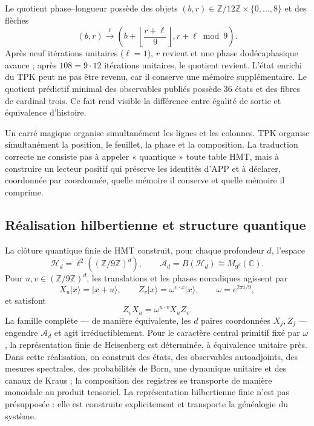 Le quotient phase--longueur possède des objets $(b,r)\in\mathbb Z/12\mathbb Z
\times\{0,\ldots,8\}$ et des flèches
\[
 (b,r)\xrightarrow{\ell}
 \left(b+\left\lfloor\frac{r+\ell}{9}\right\rfloor,
       r+\ell\bmod9\right).
 \tag{GMC-2.11}
\]
Après neuf itérations unitaires ($\ell=1$), $r$ revient et une phase
dodécaphasique avance ; après $108=9\cdot12$ itérations unitaires, le quotient revient.
L'état enrichi du TPK peut ne pas
être revenu, car il conserve une mémoire supplémentaire. Le quotient prédictif
minimal des observables publiés possède 36 états et des fibres de cardinal
trois. Ce fait rend visible la différence entre égalité de sortie et
équivalence d'histoire.

\begin{intuitionbox}
Un carré magique organise simultanément les lignes et les colonnes. TPK organise
simultanément la position, le feuillet, la phase et la composition. La traduction correcte ne
consiste pas à appeler « quantique » toute table HMT, mais à construire un lecteur
positif qui préserve les identités d'APP et à déclarer, coordonnée par
coordonnée, quelle mémoire il conserve et quelle mémoire il comprime.
\end{intuitionbox}

\subsection{Réalisation hilbertienne et structure quantique}

La clôture quantique finie de HMT construit, pour chaque profondeur
$d$, l'espace
\[
 \mathcal H_d=\ell^2((\mathbb Z/9\mathbb Z)^d),
 \qquad
 \mathcal A_d=B(\mathcal H_d)\cong M_{9^d}(\mathbb C).
 \tag{GMC-2.12}
\]
Pour $u,v\in(\mathbb Z/9\mathbb Z)^d$, les translations et les phases nonadiques
agissent par
\[
 X_u|x\rangle=|x+u\rangle,
 \qquad
 Z_v|x\rangle=\omega^{v\cdot x}|x\rangle,
 \qquad \omega=e^{2\pi i/9},
\]
et satisfont
\[
 Z_vX_u=\omega^{u\cdot v}X_uZ_v.
\]
La famille complète --- de manière équivalente, les $d$ paires coordonnées
$X_j,Z_j$ --- engendre $\mathcal A_d$ et agit irréductiblement. Pour le caractère
central primitif fixé par $\omega$, la représentation finie de Heisenberg
est déterminée, à équivalence unitaire près. Dans cette réalisation, on
construit des états, des observables autoadjoints, des mesures
spectrales, des probabilités de Born, une dynamique unitaire et des canaux de Kraus ; la
composition des registres se transporte de manière monoïdale au produit tensoriel.
La représentation hilbertienne finie n'est pas présupposée : elle est construite
explicitement et transporte la généalogie du système.

